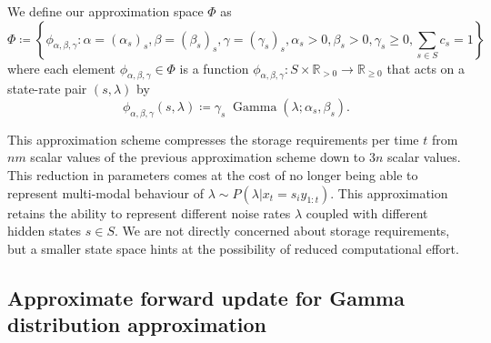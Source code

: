 \documentclass[twoside, 11pt]{article}
\DeclareMathOperator*{\gammad}{Gamma}
\newcommand{\reals}[0] {\mathbb{R}}
\begin{document}
We define our approximation space $\Phi$ as
\begin{equation}
\Phi \coloneqq \left\{ \phi_{\alpha, \beta, \gamma} : \alpha = (\alpha_s)_s, \beta = (\beta_s)_s, \gamma = (\gamma_s)_s, \alpha_s > 0, \beta_s > 0, \gamma_s \geq 0, \sum_{s \in S} c_s = 1 \right\}
\end{equation}
where each element $\phi_{\alpha, \beta, \gamma} \in \Phi$ is a function $\phi_{\alpha, \beta, \gamma} : S \times \reals_{>0} \rightarrow \reals_{\geq 0}$ that acts on a state-rate pair $(s, \lambda)$ by
\begin{equation}
\phi_{\alpha, \beta, \gamma} (s, \lambda) \coloneqq \gamma_s \; \gammad(\lambda ; \alpha_s, \beta_s) .
\end{equation}

This approximation scheme compresses the storage requirements per time $t$ from $n m$ scalar values of the previous approximation scheme down to $3 n$ scalar values. This reduction in parameters comes at the cost of no longer being able to represent multi-modal behaviour of $\lambda \sim P(\lambda | x_t=s_i y_{1:t})$. This approximation retains the ability to represent different noise rates $\lambda$ coupled with different hidden states $s \in S$. We are not directly concerned about storage requirements, but a smaller state space hints at the possibility of reduced computational effort.

\subsection{Approximate forward update for Gamma distribution approximation}
\end{document}
